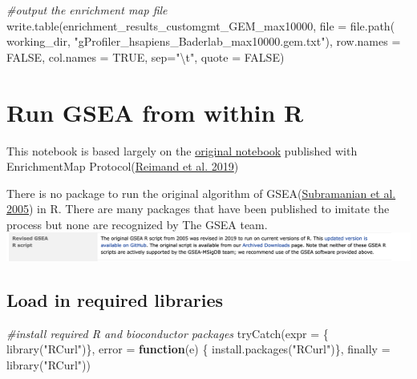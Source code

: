 \documentclass[
]{book}
\newenvironment{Shaded}{\begin{snugshade}}{\end{snugshade}}
\newcommand{\AttributeTok}[1]{\textcolor[rgb]{0.77,0.63,0.00}{#1}}
\newcommand{\CommentTok}[1]{\textcolor[rgb]{0.56,0.35,0.01}{\textit{#1}}}
\newcommand{\ConstantTok}[1]{\textcolor[rgb]{0.00,0.00,0.00}{#1}}
\newcommand{\ControlFlowTok}[1]{\textcolor[rgb]{0.13,0.29,0.53}{\textbf{#1}}}
\newcommand{\FunctionTok}[1]{\textcolor[rgb]{0.00,0.00,0.00}{#1}}
\newcommand{\NormalTok}[1]{#1}
\newcommand{\SpecialCharTok}[1]{\textcolor[rgb]{0.00,0.00,0.00}{#1}}
\newcommand{\StringTok}[1]{\textcolor[rgb]{0.31,0.60,0.02}{#1}}
\begin{document}
\begin{Shaded}
\begin{Highlighting}[]
\CommentTok{\#output the enrichment map file}
\FunctionTok{write.table}\NormalTok{(enrichment\_results\_customgmt\_GEM\_max10000, }
                  \AttributeTok{file =} \FunctionTok{file.path}\NormalTok{(}
\NormalTok{                    working\_dir, }\StringTok{"gProfiler\_hsapiens\_Baderlab\_max10000.gem.txt"}\NormalTok{),}
                  \AttributeTok{row.names =} \ConstantTok{FALSE}\NormalTok{, }
                  \AttributeTok{col.names =} \ConstantTok{TRUE}\NormalTok{, }\AttributeTok{sep=}\StringTok{"}\SpecialCharTok{\textbackslash{}t}\StringTok{"}\NormalTok{,}
                  \AttributeTok{quote =} \ConstantTok{FALSE}\NormalTok{)}
\end{Highlighting}
\end{Shaded}

\hypertarget{run-gsea-from-within-r}{%
\chapter{Run GSEA from within R}\label{run-gsea-from-within-r}}

This notebook is based largely on the \href{https://baderlab.github.io/Cytoscape_workflows/EnrichmentMapPipeline/Protocol2_createEM.html}{original notebook} published with EnrichmentMap Protocol(\protect\hyperlink{ref-em2019}{Reimand et al. 2019})

There is no package to run the original algorithm of GSEA(\protect\hyperlink{ref-gsea2005}{Subramanian et al. 2005}) in R. There are many packages that have been published to imitate the process but none are recognized by The GSEA team.\\
\includegraphics{./images/gsea_r_package_message.png}

\hypertarget{load-in-required-libraries}{%
\section{Load in required libraries}\label{load-in-required-libraries}}

\begin{Shaded}
\begin{Highlighting}[]
\CommentTok{\#install required R and bioconductor packages}
\FunctionTok{tryCatch}\NormalTok{(}\AttributeTok{expr =}\NormalTok{ \{ }\FunctionTok{library}\NormalTok{(}\StringTok{"RCurl"}\NormalTok{)\}, }
         \AttributeTok{error =} \ControlFlowTok{function}\NormalTok{(e) \{  }
           \FunctionTok{install.packages}\NormalTok{(}\StringTok{"RCurl"}\NormalTok{)\}, }
         \AttributeTok{finally =} \FunctionTok{library}\NormalTok{(}\StringTok{"RCurl"}\NormalTok{))}
\end{Highlighting}
\end{Shaded}
\end{document}
